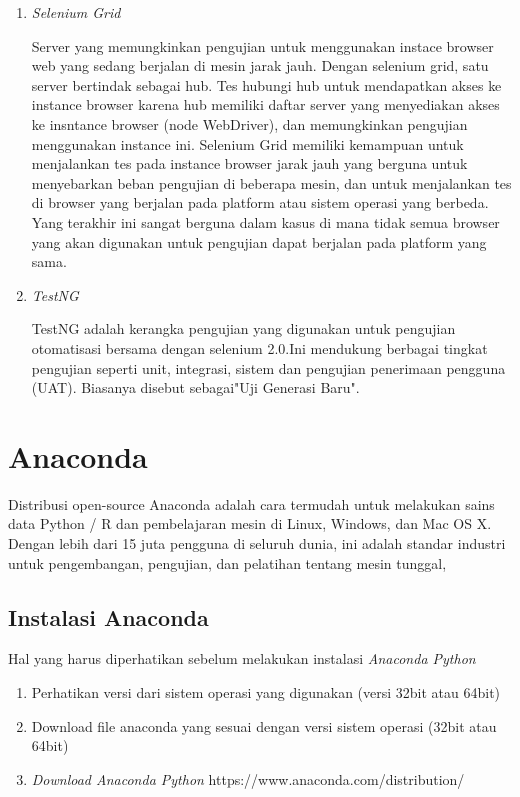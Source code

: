 \begin{enumerate}
\item \textit{Selenium Grid}
\par Server yang memungkinkan pengujian untuk menggunakan instace browser web yang sedang berjalan di mesin jarak jauh. Dengan selenium grid, satu server bertindak sebagai hub. Tes hubungi hub untuk mendapatkan akses ke instance browser karena hub memiliki daftar server yang menyediakan akses ke insntance browser (node WebDriver), dan memungkinkan pengujian menggunakan instance ini. Selenium Grid memiliki kemampuan untuk menjalankan tes pada instance browser jarak jauh yang berguna untuk menyebarkan beban pengujian di beberapa mesin, dan untuk menjalankan tes di browser yang berjalan pada platform atau sistem operasi yang berbeda. Yang terakhir ini sangat berguna dalam kasus di mana tidak semua browser yang akan digunakan untuk pengujian dapat berjalan pada platform yang sama.

\item \textit{TestNG} 
\par TestNG adalah kerangka pengujian yang digunakan untuk pengujian otomatisasi bersama dengan selenium 2.0.Ini mendukung berbagai tingkat pengujian seperti unit, integrasi, sistem dan pengujian penerimaan pengguna (UAT). Biasanya disebut sebagai"Uji Generasi Baru".
\end{enumerate}

\section{Anaconda}
Distribusi open-source Anaconda adalah cara termudah untuk melakukan sains data Python / R dan pembelajaran mesin di Linux, Windows, dan Mac OS X. Dengan lebih dari 15 juta pengguna di seluruh dunia, ini adalah standar industri untuk pengembangan, pengujian, dan pelatihan tentang mesin tunggal,

\subsection{Instalasi Anaconda}
Hal yang harus diperhatikan sebelum melakukan instalasi \textit{Anaconda Python}
\begin{enumerate}
 \item Perhatikan versi dari sistem operasi yang digunakan (versi 32bit atau 64bit)
 \item Download file anaconda yang sesuai dengan versi sistem operasi (32bit atau 64bit)
 \item \textit{Download Anaconda Python} https://www.anaconda.com/distribution/
\end{enumerate}

